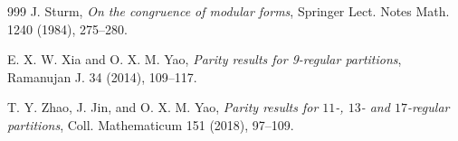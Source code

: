 \documentclass[reqno]{amsart}
\theoremstyle{definition}
\theoremstyle{remark}
\numberwithin{equation}{section}
\begin{document}
\begin{thebibliography}{999}
J. Sturm, {\it On the congruence of modular forms}, Springer Lect. Notes Math. 1240 (1984), 275--280.


E. X. W. Xia and O. X. M. Yao, {\it Parity results for 9-regular partitions}, Ramanujan J. 34 (2014), 109--117.


T. Y. Zhao, J. Jin, and O. X. M. Yao, {\it Parity results for $11$-, $13$- and $17$-regular partitions}, Coll. Mathematicum 151 (2018), 97--109.

\end{thebibliography}
\end{document}
